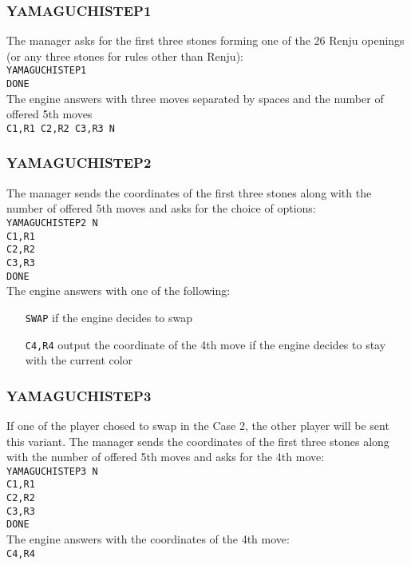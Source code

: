 \documentclass[12pt,a4paper]{article}
\begin{document}
\subsubsection{YAMAGUCHISTEP1}
The manager asks for the first three stones forming one of the 26 Renju openings (or any three stones for rules other than Renju):\\
\texttt{YAMAGUCHISTEP1}\\
\texttt{DONE}\\
The engine answers with three moves separated by spaces and the number of offered 5th moves\\
\texttt{C1,R1 C2,R2 C3,R3 N}

\subsubsection{YAMAGUCHISTEP2}
The manager sends the coordinates of the first three stones along with the number of offered 5th moves and asks for the choice of options:\\
\texttt{YAMAGUCHISTEP2 N}\\
\texttt{C1,R1}\\
\texttt{C2,R2}\\
\texttt{C3,R3}\\
\texttt{DONE}\\
The engine answers with one of the following:
\begin{enumerate}[leftmargin=7.5em]
\item[\texttt{SWAP}]{if the engine decides to swap}
\item[\texttt{C4,R4}]{output the coordinate of the 4th move if the engine decides to stay with the current color}
\end{enumerate}

\subsubsection{YAMAGUCHISTEP3}
If one of the player chosed to swap in the Case 2, the other player will be sent this variant. The manager sends the coordinates of the first three stones along with the number of offered 5th moves and asks for the 4th move:\\
\texttt{YAMAGUCHISTEP3 N}\\
\texttt{C1,R1}\\
\texttt{C2,R2}\\
\texttt{C3,R3}\\
\texttt{DONE}\\
The engine answers with the coordinates of the 4th move:\\
\texttt{C4,R4}
\end{document}
